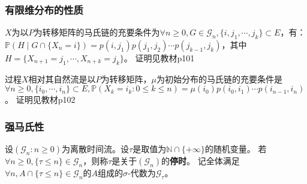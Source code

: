 \documentclass[main]{subfiles}
\begin{document}
\subsubsection{有限维分布的性质}
\begin{theorem}\label{the:4.2.5}
  \(X\)为以\(P\)为转移矩阵的马氏链的充要条件为\(\forall n \geq 0,G \in \mathcal{G}_n,\{i,j_1,\cdots,j_k\} \subset E\)，有：
  \(\mathbb{P}(H \mid G \cap \{X_n=i\})=p(i,j_1)p(j_1,j_2)\cdots p(j_{k-1},j_k)\)，其中\(H=\{X_{n+1}=j_1,\cdots,X_{n+k}=j_k\}\)。
  证明见教材p101
\end{theorem}
\begin{theorem}\label{the:4.2.7}
  过程\(X\)相对其自然流是以\(P\)为转移矩阵，\(\mu\)为初始分布的马氏链的充要条件是
  \(\forall n \geq 0,\{i_0,\cdots,i_n\} \subset E,\mathbb{P}(X_k=i_k:0 \leq k \leq n)=\mu(i_0)p(i_0,i_1)\cdots p(i_{n-1},i_n)\)。
  证明见教材p102
\end{theorem}
\subsubsection{强马氏性}
\begin{definition}\label{def:stopping_time}
  设\((\mathcal{G}_n:n \geq 0)\)为离散时间流。设\(\tau\)是取值为\(\mathbb{N} \cap \{+\infty\}\)的随机变量。
  若\(\forall n \geq 0,\{\tau \leq n\}\in \mathcal{G}_n\)，则称\(\tau\)是关于\((\mathcal{G}_n)\)的\textbf{停时}。
  记全体满足\(\forall n,A \cap \{\tau \leq n\} \in \mathcal{G}_n\)的\(A\)组成的\(\sigma\)-代数为\(\mathcal{G}_\tau\)。
\end{definition}
\begin{theorem}

\end{theorem}

\ifSubfilesClassLoaded{%
  \printindex}{%
}
\end{document}
